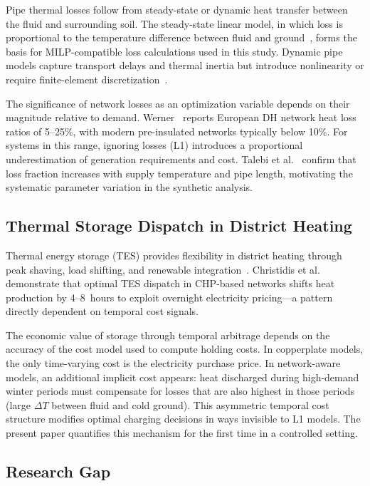 \documentclass[review,3p]{elsarticle}
\begin{document}
Pipe thermal losses follow from steady-state or dynamic heat transfer
between the fluid and surrounding soil. The steady-state linear model,
in which loss is proportional to the temperature difference between
fluid and ground~\cite{Paalsson1999,Frederiksen2013}, forms the basis
for MILP-compatible loss calculations used in this study.
Dynamic pipe models capture transport delays and thermal inertia but
introduce nonlinearity or require finite-element
discretization~\cite{vanderHeijde2017,Duquette2016}.

The significance of network losses as an optimization variable depends
on their magnitude relative to demand. Werner~\cite{Werner2017} reports
European DH network heat loss ratios of 5--25\%, with modern
pre-insulated networks typically below 10\%. For systems in this
range, ignoring losses (L1) introduces a proportional underestimation
of generation requirements and cost. Talebi et al.~\cite{Talebi2016}
confirm that loss fraction increases with supply temperature and pipe
length, motivating the systematic parameter variation in the synthetic
analysis.

\subsection{Thermal Storage Dispatch in District Heating}
\label{sec:rw_storage}

Thermal energy storage (TES) provides flexibility in district heating
through peak shaving, load shifting, and renewable
integration~\cite{Vandermeulen2018,Guelpa2019review}. Christidis et
al.~\cite{Christidis2017} demonstrate that optimal TES dispatch in
CHP-based networks shifts heat production by 4--8~hours to exploit
overnight electricity pricing---a pattern directly dependent on
temporal cost signals.

The economic value of storage through temporal arbitrage depends on
the accuracy of the cost model used to compute holding costs. In
copperplate models, the only time-varying cost is the electricity
purchase price. In network-aware models, an additional implicit cost
appears: heat discharged during high-demand winter periods must
compensate for losses that are also highest in those periods (large
$\Delta T$ between fluid and cold ground). This asymmetric temporal
cost structure modifies optimal charging decisions in ways invisible
to L1 models. The present paper quantifies this mechanism for the
first time in a controlled setting.

\subsection{Research Gap}
\label{sec:rw_gap}
\end{document}
